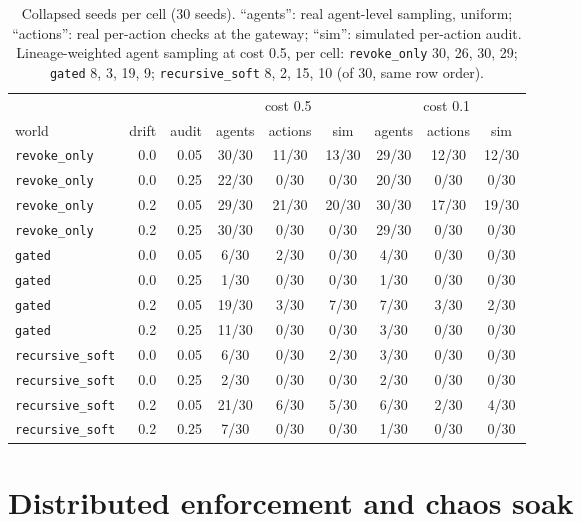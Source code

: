 \documentclass[11pt]{article}
\newcommand{\code}[1]{\texttt{#1}}
\begin{document}
\begin{table}[h]
\centering\small
\begin{tabular}{lrrcccccc}
\toprule
 & & & \multicolumn{3}{c}{cost 0.5} & \multicolumn{3}{c}{cost 0.1} \\
\cmidrule(lr){4-6}\cmidrule(lr){7-9}
world & drift & audit & agents & actions & sim & agents & actions & sim \\
\midrule
\code{revoke\_only} & 0.0 & 0.05 & 30/30 & 11/30 & 13/30 & 29/30 & 12/30 & 12/30 \\
\code{revoke\_only} & 0.0 & 0.25 & 22/30 & 0/30 & 0/30 & 20/30 & 0/30 & 0/30 \\
\code{revoke\_only} & 0.2 & 0.05 & 29/30 & 21/30 & 20/30 & 30/30 & 17/30 & 19/30 \\
\code{revoke\_only} & 0.2 & 0.25 & 30/30 & 0/30 & 0/30 & 29/30 & 0/30 & 0/30 \\
\code{gated} & 0.0 & 0.05 & 6/30 & 2/30 & 0/30 & 4/30 & 0/30 & 0/30 \\
\code{gated} & 0.0 & 0.25 & 1/30 & 0/30 & 0/30 & 1/30 & 0/30 & 0/30 \\
\code{gated} & 0.2 & 0.05 & 19/30 & 3/30 & 7/30 & 7/30 & 3/30 & 2/30 \\
\code{gated} & 0.2 & 0.25 & 11/30 & 0/30 & 0/30 & 3/30 & 0/30 & 0/30 \\
\code{recursive\_soft} & 0.0 & 0.05 & 6/30 & 0/30 & 2/30 & 3/30 & 0/30 & 0/30 \\
\code{recursive\_soft} & 0.0 & 0.25 & 2/30 & 0/30 & 0/30 & 2/30 & 0/30 & 0/30 \\
\code{recursive\_soft} & 0.2 & 0.05 & 21/30 & 6/30 & 5/30 & 6/30 & 2/30 & 4/30 \\
\code{recursive\_soft} & 0.2 & 0.25 & 7/30 & 0/30 & 0/30 & 1/30 & 0/30 & 0/30 \\
\bottomrule
\end{tabular}
\caption{Collapsed seeds per cell (30 seeds). ``agents'': real agent-level sampling, uniform;
``actions'': real per-action checks at the gateway; ``sim'': simulated per-action audit.
Lineage-weighted agent sampling at cost 0.5, per cell: \code{revoke\_only} 30, 26, 30, 29;
\code{gated} 8, 3, 19, 9; \code{recursive\_soft} 8, 2, 15, 10 (of 30, same row order).}
\label{tab:auditcells}
\end{table}

\section{Distributed enforcement and chaos soak}
\label{app:soak}
\end{document}
